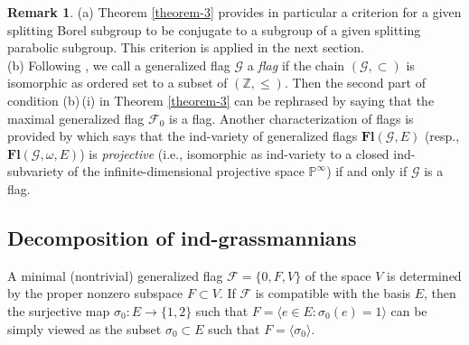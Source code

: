 \documentclass[12pt]{amsart}
\theoremstyle{definition}
\newtheorem{remark}{Remark}
\begin{document}
\begin{remark}
{\rm (a)}
Theorem \ref{theorem-3} provides in particular a criterion for a given splitting Borel subgroup to be conjugate to a subgroup of a given splitting parabolic subgroup. This criterion is applied in the next section. \\
{\rm (b)}
Following \cite{DP}, we call a generalized flag $\mathcal{G}$ a {\em flag} if the chain $(\mathcal{G},\subset)$ is isomorphic as ordered set to a subset of $(\mathbb{Z},\leq)$.
Then the second part of condition {\rm (b)}\,{\rm (i)} in Theorem \ref{theorem-3} can be rephrased by saying that the maximal generalized flag $\mathcal{F}_0$ is a flag. Another characterization of flags is provided by \cite[Proposition 7.2]{DP} which says that the ind-variety of generalized flags $\mathbf{Fl}(\mathcal{G},E)$ (resp., $\mathbf{Fl}(\mathcal{G},\omega,E)$) is {\em projective} (i.e., isomorphic as ind-variety to a closed ind-subvariety of the infinite-dimensional projective space $\mathbb{P}^\infty$) if and only if $\mathcal{G}$ is a flag.
\end{remark}

\subsection{Decomposition of ind-grassmannians}

\label{section-4-5}

A minimal (nontrivial) generalized flag $\mathcal{F}=\{0,F,V\}$ of the space $V$ is determined by the proper nonzero subspace $F\subset V$. If $\mathcal{F}$ is compatible with the basis $E$, then the surjective map $\sigma_0:E\to \{1,2\}$ such that $F=\langle e\in E:\sigma_0(e)=1\rangle$ can be simply viewed as the subset $\sigma_0\subset E$ such that $F=\langle \sigma_0\rangle$.
\end{document}
